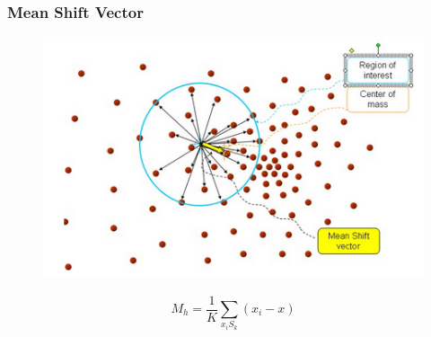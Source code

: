 \documentclass[notheorems,serif,table,compress]{beamer}  %
\begin{document}
\begin{frame}
\frametitle{Mean Shift Vector}
    \begin{figure}
    \includegraphics[width=0.5\linewidth]{msv.png}
    \end{figure}
    \begin{displaymath}
    M_{h}=\frac{1}{K}\sum_{x_{i}S_{k}}(x_{i}-x)
    \end{displaymath}
\end{frame}
\end{document}
